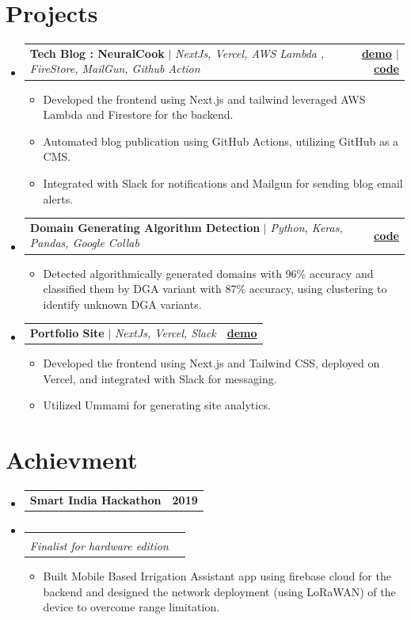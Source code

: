 \documentclass[letterpaper,11pt]{article}
\makeatletter
\newcommand{\resumeItem}[1]{
  \item\small{
    {#1 \vspace{-2pt}}
  }
}
\newcommand{\resumeSubheading}[4]{
  \vspace{-2pt}\item
    \begin{tabular*}{1.0\textwidth}[t]{l@{\extracolsep{\fill}}r}
      \textbf{#1} & \textbf{\small #2} \\
      \textit{\small#3} & \textit{\small #4} \\
    \end{tabular*}\vspace{-7pt}
}
\newcommand{\resumeProjectHeading}[2]{
    \item
    \begin{tabular*}{1.001\textwidth}{l@{\extracolsep{\fill}}r}
      \small#1 & \textbf{\small #2}\\
    \end{tabular*}\vspace{-7pt}
}
\newcommand{\resumeSubHeadingListStart}{\begin{itemize}[leftmargin=0.0in, label={}]}
\newcommand{\resumeSubHeadingListEnd}{\end{itemize}}
\newcommand{\resumeItemListStart}{\begin{itemize}}
\newcommand{\resumeItemListEnd}{\end{itemize}\vspace{-5pt}}
\makeatother
\begin{document}
\section{Projects}
\vspace{-5pt}
\resumeSubHeadingListStart
\resumeProjectHeading
{\textbf{Tech Blog : NeuralCook} $|$ \emph{NextJs, Vercel, AWS Lambda , FireStore, MailGun, Github Action}}{\href{https://www.neuralcook.com}{demo} $|$ \href{https://github.com/Vikramadtya/Blog}{code}}
\resumeItemListStart
\resumeItem{Developed the frontend using Next.js and tailwind leveraged AWS Lambda and Firestore for the backend.}
\resumeItem{Automated blog publication using GitHub Actions, utilizing GitHub as a CMS.
}
\resumeItem{Integrated with Slack for notifications and Mailgun for sending blog email alerts.}
\resumeItemListEnd
\vspace{-13pt}
\resumeProjectHeading
{\textbf{Domain Generating Algorithm Detection} $|$ \emph{Python, Keras, Pandas, Google Collab}}{\href{https://github.com/Vikramadtya/DGA-Detector}{code}}
\resumeItemListStart
\resumeItem{Detected algorithmically generated domains with 96\% accuracy and classified them by DGA variant with 87\% accuracy, using clustering to identify unknown DGA variants.}
\resumeItemListEnd
\vspace{-13pt}
\resumeProjectHeading
{\textbf{Portfolio Site} $|$ \emph{NextJs, Vercel, Slack}}{\href{https://www.vikramaditya-singh.in}{demo}}
\resumeItemListStart
\resumeItem{Developed the frontend using Next.js and Tailwind CSS, deployed on Vercel, and integrated with Slack for messaging.}
\resumeItem{Utilized Ummami for generating site analytics.}
\resumeItemListEnd
\resumeSubHeadingListEnd
\vspace{-15pt}


\section{Achievment}
\vspace{-5pt}
\resumeSubHeadingListStart
\resumeProjectHeading
{\textbf{Smart India Hackathon}}{2019}
\vspace{-28pt}
\resumeSubheading
{}{}
{Finalist for hardware edition}{}
\resumeItemListStart
\resumeItem{
	Built Mobile Based
	Irrigation Assistant app using
	firebase cloud for the backend and
	designed the network deployment
	(using LoRaWAN) of the device to
overcome range limitation.}
\resumeItemListEnd

\resumeSubHeadingListEnd
\vspace{-15pt}
\end{document}
